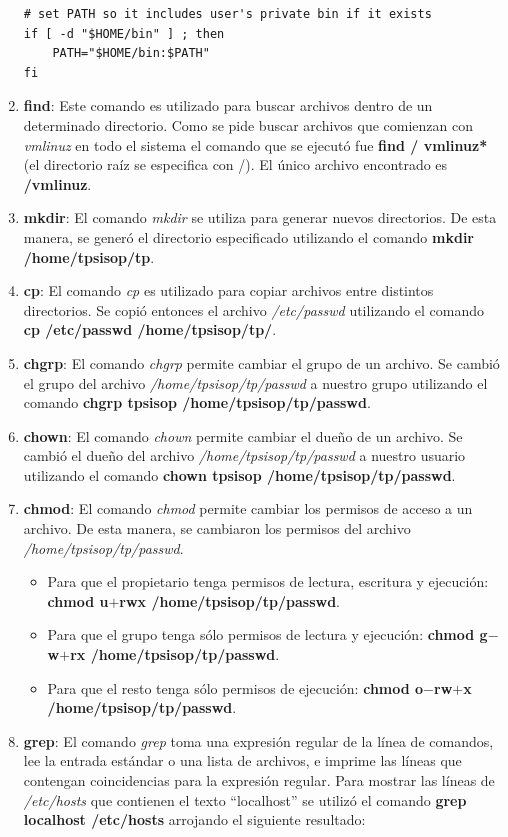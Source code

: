 \documentclass[a4paper,11pt] {article}
\begin{document}
\begin{enumerate}
\begin{verbatim}
# set PATH so it includes user's private bin if it exists
if [ -d "$HOME/bin" ] ; then
    PATH="$HOME/bin:$PATH"
fi
	\end{verbatim}
	\item \textbf{find}: Este comando es utilizado para buscar archivos dentro de un determinado directorio. Como se pide buscar archivos que comienzan con \textit{vmlinuz} en todo el sistema el comando que se ejecut\'o fue \textbf{find / vmlinuz*} (el directorio ra\'iz se especifica con /). El \'unico archivo encontrado es \textbf{/vmlinuz}.
	\item \textbf{mkdir}: El comando \textit{mkdir} se utiliza para generar nuevos directorios. De esta manera, se gener\'o el directorio especificado utilizando el comando \textbf{mkdir /home/tpsisop/tp}.
	\item \textbf{cp}: El comando \textit{cp} es utilizado para copiar archivos entre distintos directorios. Se copi\'o entonces el archivo \textit{/etc/passwd} utilizando el comando \textbf{cp /etc/passwd /home/tpsisop/tp/}.
	\item \textbf{chgrp}: El comando \textit{chgrp} permite cambiar el grupo de un archivo. Se cambi\'o el grupo del archivo \textit{/home/tpsisop/tp/passwd} a nuestro grupo utilizando el comando \textbf{chgrp tpsisop /home/tpsisop/tp/passwd}.
	\item \textbf{chown}: El comando \textit{chown} permite cambiar el dueño de un archivo. Se cambi\'o el dueño del archivo \textit{/home/tpsisop/tp/passwd} a nuestro usuario utilizando el comando \textbf{chown tpsisop /home/tpsisop/tp/passwd}.
	\item \textbf{chmod}: El comando \textit{chmod} permite cambiar los permisos de acceso a un archivo. De esta manera, se cambiaron los permisos del archivo \textit{/home/tpsisop/tp/passwd}.
		\begin{itemize}
			\item Para que el propietario tenga permisos de lectura, escritura y ejecuci\'on: \textbf{chmod u$+$rwx /home/tpsisop/tp/passwd}.
			\item Para que el grupo tenga s\'olo permisos de lectura y ejecuci\'on: \textbf{chmod g$-$w$+$rx /home/tpsisop/tp/passwd}.
			\item Para que el resto tenga s\'olo permisos de ejecuci\'on: \textbf{chmod o$-$rw$+$x /home/tpsisop/tp/passwd}.
		\end{itemize}
	\item \textbf{grep}: El comando \textit{grep} toma una expresión regular de la línea de comandos, lee la entrada est\'andar o una lista de archivos, e imprime las l\'ineas que contengan coincidencias para la expresi\'on regular. Para mostrar las l\'ineas de \textit{/etc/hosts} que contienen el texto ``localhost'' se utiliz\'o el comando \textbf{grep localhost /etc/hosts} arrojando el siguiente resultado:

\end{enumerate}
\end{document}
